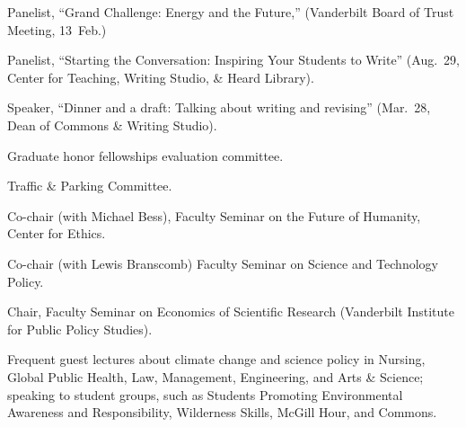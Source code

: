 \item[2015] Panelist, ``Grand Challenge: Energy and the Future,'' (Vanderbilt
  Board of Trust Meeting, 13~Feb.)
\item[2013] Panelist, ``Starting the Conversation: Inspiring Your Students to
  Write'' (Aug.~29, Center for Teaching, Writing Studio, \& Heard Library).
\item[2013] Speaker, ``Dinner and a draft: Talking about writing and revising''
  (Mar.~28, Dean of Commons \& Writing Studio).
\item[2013] Graduate honor fellowships evaluation committee.
\item[2010--2013] Traffic \& Parking Committee.
\item[2008] Co-chair (with Michael Bess), Faculty Seminar on the Future of
  Humanity, Center for Ethics.
\item[1999--2000] Co-chair (with Lewis Branscomb) Faculty Seminar on Science
  and Technology Policy.
\item[1996--1997] Chair, Faculty Seminar on Economics of Scientific Research
  (Vanderbilt Institute for Public Policy Studies).
\item[Ongoing] Frequent guest lectures about climate change and science policy
  in Nursing, Global Public Health, Law, Management, Engineering, and Arts \&
  Science; speaking to student groups, such as Students Promoting Environmental
  Awareness and Responsibility, Wilderness Skills, McGill Hour, and Commons.

